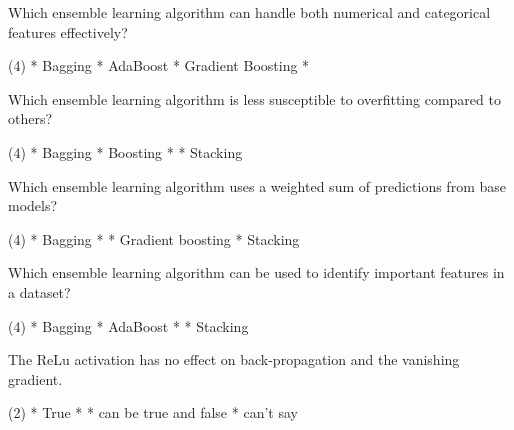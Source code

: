 \documentclass[10pt]{extarticle}
\begin{document}
\begin{exercise}
    Which ensemble learning algorithm can handle both numerical and categorical features effectively?
    \begin{choice} (4)
        * Bagging
        * AdaBoost
        * Gradient Boosting
        * 
    \end{choice}
\end{exercise}
\begin{solution}
\end{solution}

\begin{exercise}
    Which ensemble learning algorithm is less susceptible to overfitting compared to others?
    \begin{choice} (4)
        * Bagging
        * Boosting
        * 
        * Stacking
    \end{choice}
\end{exercise}
\begin{solution}
\end{solution}

\begin{exercise}
    Which ensemble learning algorithm uses a weighted sum of predictions from base models?
    \begin{choice} (4)
        * Bagging
        * 
        * Gradient boosting
        * Stacking
    \end{choice}
\end{exercise}
\begin{solution}
\end{solution}

\begin{exercise}
    Which ensemble learning algorithm can be used to identify important features in a dataset?
    \begin{choice} (4)
        * Bagging
        * AdaBoost
        * 
        * Stacking
    \end{choice}
\end{exercise}
\begin{solution}
\end{solution}

\begin{exercise}
    The ReLu activation has no effect on back-propagation and the vanishing gradient.
    \begin{choice} (2)
        * True
        * 
        * can be true and false
        * can't say
    \end{choice}
\end{exercise}
\begin{solution}
\end{solution}
\end{document}
